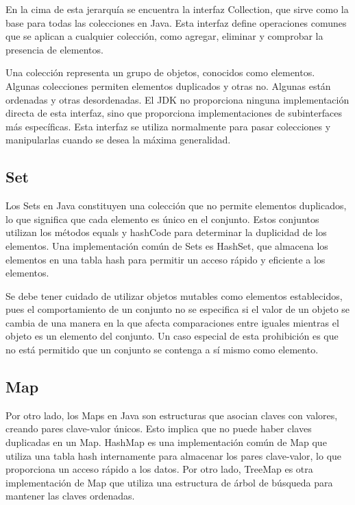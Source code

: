 \documentclass[a4paper,12pt]{article}
\begin{document}
En la cima de esta jerarquía se encuentra la interfaz Collection, que sirve como la base para todas las colecciones en Java. Esta interfaz define operaciones comunes que se aplican a cualquier colección, como agregar, eliminar y comprobar la presencia de elementos.

Una colección representa un grupo de objetos, conocidos como elementos. Algunas colecciones permiten elementos duplicados y otras no. Algunas están ordenadas y otras desordenadas. El JDK no proporciona ninguna implementación directa de esta interfaz, sino que proporciona implementaciones de subinterfaces más específicas. Esta interfaz se utiliza normalmente para pasar colecciones y manipularlas cuando se desea la máxima generalidad. \cite{collection}

\subsection{Set}

Los Sets en Java constituyen una colección que no permite elementos duplicados, lo que significa que cada elemento es único en el conjunto. Estos conjuntos utilizan los métodos equals y hashCode para determinar la duplicidad de los elementos. Una implementación común de Sets es HashSet, que almacena los elementos en una tabla hash para permitir un acceso rápido y eficiente a los elementos.

Se debe tener cuidado de utilizar objetos mutables como elementos establecidos, pues el comportamiento de un conjunto no se especifica si el valor de un objeto se cambia de una manera en la que afecta comparaciones entre iguales mientras el objeto es un elemento del conjunto. Un caso especial de esta prohibición es que no está permitido que un conjunto se contenga a sí mismo como elemento.\cite{set}

\subsection{Map}

Por otro lado, los Maps en Java son estructuras que asocian claves con valores, creando pares clave-valor únicos. Esto implica que no puede haber claves duplicadas en un Map. HashMap es una implementación común de Map que utiliza una tabla hash internamente para almacenar los pares clave-valor, lo que proporciona un acceso rápido a los datos. Por otro lado, TreeMap es otra implementación de Map que utiliza una estructura de árbol de búsqueda para mantener las claves ordenadas.
\end{document}
